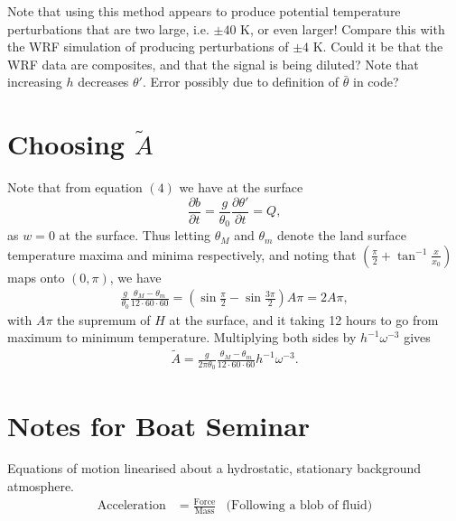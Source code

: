 \documentclass[12pt]{article}
\begin{document}
Note that using this method appears to produce potential temperature perturbations that are two large, i.e. $\pm 40$ K, or even larger! Compare this with the WRF simulation of \citet{vincent16} producing perturbations of $\pm 4$ K. Could it be that the WRF data are composites, and that the signal is being diluted? Note that increasing $h$ decreases $\theta'$. Error possibly due to definition of $\bar{\theta}$ in code? 

\section{Choosing $\tilde{A}$}
Note that from equation $(4)$ we have at the surface
\begin{equation*}
\frac{\partial b}{\partial t} = \frac{g}{\theta_0}\frac{\partial \theta'}{\partial t}= Q,
\end{equation*}
as $w=0$ at the surface. Thus letting $\theta_M$ and $\theta_m$ denote the land surface temperature maxima and minima respectively, and noting that $\left(\frac{\pi}{2} + \tan^{-1} \frac{x}{x_0} \right)$ maps onto $\left(0, \pi \right)$, we have
\begin{align*}
\frac{g}{\theta_0}\frac{\theta_M - \theta_m}{12\cdot 60\cdot 60} =  \left( \sin\frac{\pi}{2} - \sin\frac{3\pi}{2} \right)A\pi = 2 A \pi,
\end{align*}
with $A \pi$ the supremum of $H$ at the surface, and it taking 12 hours to go from maximum to minimum temperature. Multiplying both sides by $h^{-1} \omega^{-3}$ gives  
\begin{align*}
\tilde{A} = \frac{g}{2 \pi \theta_0}\frac{\theta_M - \theta_m}{12\cdot 60\cdot 60} h^{-1} \omega ^{-3}. 
\end{align*}

\section{Notes for Boat Seminar}
Equations of motion linearised about a hydrostatic, stationary background atmosphere. 
\begin{align*}
\text{Acceleration} & = \frac{\text{Force}}{\text{Mass}} & \text{(Following a blob of fluid)}
\end{align*}


\end{document}
